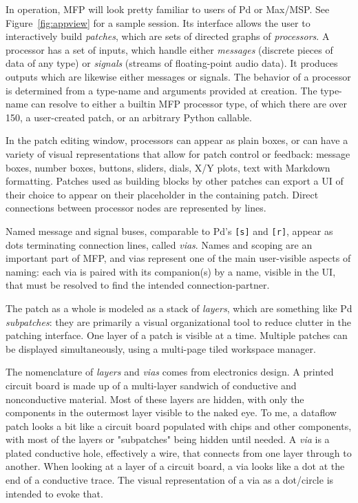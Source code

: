 \documentclass[a4paper]{article}
\begin{document}
In operation, MFP will look pretty familiar to users of Pd or
Max/MSP. See Figure~\ref{fig:appview} for a sample session. Its
interface allows the user to interactively build {\it patches},
which are sets of directed graphs of {\it processors}. A
processor has a set of inputs, which handle either {\it messages}
(discrete pieces of data of any type) or {\it signals} (streams
of floating-point audio data). It produces outputs which are
likewise either messages or signals. The behavior of a processor
is determined from a type-name and arguments provided at
creation. The type-name can resolve to either a builtin MFP
processor type, of which there are over 150, a user-created
patch, or an arbitrary Python callable.

In the patch editing window, processors can appear as plain
boxes, or can have a variety of visual representations that allow
for patch control or feedback: message boxes, number boxes,
buttons, sliders, dials, X/Y plots, text with Markdown
formatting. Patches used as building blocks by other patches can
export a UI of their choice to appear on their placeholder in the
containing patch. Direct connections between processor nodes are
represented by lines.

Named message and signal buses, comparable to Pd's {\tt [s]} and
{\tt [r]}, appear as dots terminating connection lines, called {\it
vias}. Names and scoping are an important part of MFP, and vias
represent one of the main user-visible aspects of naming: each
via is paired with its companion(s) by a name, visible in the UI,
that must be resolved to find the intended connection-partner.

The patch as a whole is modeled as a stack of {\it layers}, which
are something like Pd {\it subpatches}: they are primarily a
visual organizational tool to reduce clutter in the patching
interface. One layer of a patch is visible at a time. Multiple
patches can be displayed simultaneously, using a multi-page tiled
workspace manager.

The nomenclature of {\it layers} and {\it vias} comes from
electronics design. A printed circuit board is made up of a
multi-layer sandwich of conductive and nonconductive material.
Most of these layers are hidden, with only the components in the
outermost layer visible to the naked eye. To me, a dataflow patch
looks a bit like a circuit board populated with chips and other
components, with most of the layers or "subpatches" being hidden
until needed. A {\it via} is a plated conductive hole,
effectively a wire, that connects from one layer through to
another. When looking at a layer of a circuit board, a via looks
like a dot at the end of a conductive trace. The visual representation of a
via as a dot/circle is intended to evoke that.
\end{document}
